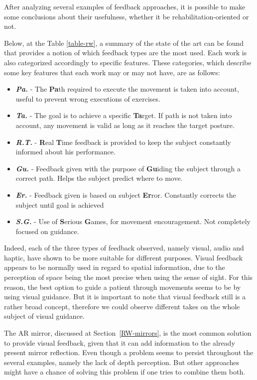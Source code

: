 After analyzing several examples of feedback approaches, it is possible to make some conclusions about their usefulness, whether it be rehabilitation-oriented or not.

Below, at the Table \ref{table-rw}, a summary of the state of 
the art can be found that provides a notion of which feedback types are the most used. 
Each work is also categorized accordingly to specific features. These categories, which describe some key features that each work may or may not have, are as follows:
\begin{itemize}
\item \emph{\textbf{Pa.}} - The \textbf{Pa}th required to execute the movement is taken into account, useful to prevent wrong executions of exercises.
\item \emph{\textbf{Ta.}} - The goal is to achieve a specific \textbf{Ta}rget. If path is not taken into account, any movement is valid as long as it reaches the target posture.
\item \emph{\textbf{R.T.}} - \textbf{R}eal \textbf{T}ime feedback is provided to keep the subject constantly informed about his performance.
\item \emph{\textbf{Gu.}} - Feedback given with the purpose of \textbf{Gu}iding the subject through a correct path. Helps the subject predict where to move. 
\item \emph{\textbf{Er.}} - Feedback given is based on subject \textbf{Er}ror. Constantly corrects the subject until goal is achieved
\item \emph{\textbf{S.G.}} - Use of \textbf{S}erious \textbf{G}ames, for movement encouragement. Not completely focused on guidance.
\end{itemize}

Indeed, each of the three types of feedback observed, namely visual, audio and haptic, have shown to be more suitable for different purposes.
Visual feedback appears to be normally used in regard to spatial information, due to the perception of space being the most precise when using the sense of sight. 
For this reason, the best option to guide a patient through movements seems to be by using visual guidance.
But it is important to note that visual feedback still is a rather broad concept, therefore we could observe different takes on the whole subject of visual guidance.

The \ac{AR} mirror, discussed at Section~\ref{RW-mirrors}, is the most common 
solution to provide visual feedback, given that it can add information to the already present
mirror reflection. Even though a problem seems to persist throughout the several examples, namely the lack of depth perception.
But other approaches might have a chance of solving this problem if one tries to combine them both.

